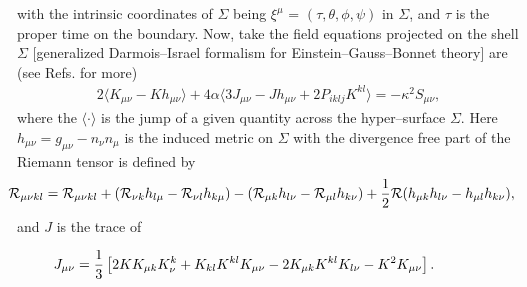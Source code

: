 \documentclass[]{aastex631}
\begin{document}
with the intrinsic coordinates of $\Sigma$ being
$\xi^{\mu}$ = $(\tau, \theta, \phi, \psi)$ in $\Sigma$, and $\tau$ is the proper time on the boundary.
Now, take the field equations projected on the shell $\Sigma$ 
[generalized Darmois--Israel \citep{darmois,israel} formalism for Einstein--Gauss--Bonnet theory] are  (see Refs. \cite{davis,gravanis} for more)
\begingroup
\small
\begin{eqnarray}  
2\langle K_{\mu\nu}-K h_{\mu\nu}\rangle + 4\alpha \langle 3J_{\mu\nu}-Jh_{\mu\nu}+2P_{iklj}K^{kl}\rangle =-\kappa^{2}S_{\mu\nu}, \label{eq62}
\end{eqnarray}
\endgroup
where the $\langle \cdot\rangle$ is the jump of a given quantity across the hyper--surface $\Sigma$. Here $h_{\mu\nu} = g_{\mu\nu} - n_{\nu}n_{\mu}$ is the induced metric on $\Sigma$ with the divergence free part of the Riemann tensor is defined by
\begin{eqnarray}
&& \hspace{-0.7cm} \mathcal{R}_{\mu\nu kl} = \mathcal{R}_{\mu\nu kl}+(\mathcal{R}_{\nu k}h_{l\mu}- \mathcal{R}_{\nu l}h_{k\mu})-(\mathcal{R}_{\mu k}h_{l\nu}- \mathcal{R}_{\mu l}h_{k\nu})  +\frac{1}{2}\mathcal{R}(h_{\mu k}h_{l\nu}-h_{\mu l}h_{k\nu}), \label{eq63}
\end{eqnarray}
and $J$ is the trace of 
\begin{small}
\begin{eqnarray}
&& \hspace{-0.9cm} J_{\mu\nu}=\frac{1}{3}\left[2KK_{\mu k}K^{k}_{\nu}+K_{kl}K^{kl}K_{\mu\nu}-2K_{\mu k}K^{kl}K_{l\nu}-K^{2}K_{\mu\nu}\right].~~~~~~ \label{eq64}
\end{eqnarray}
\end{small}
\end{document}
